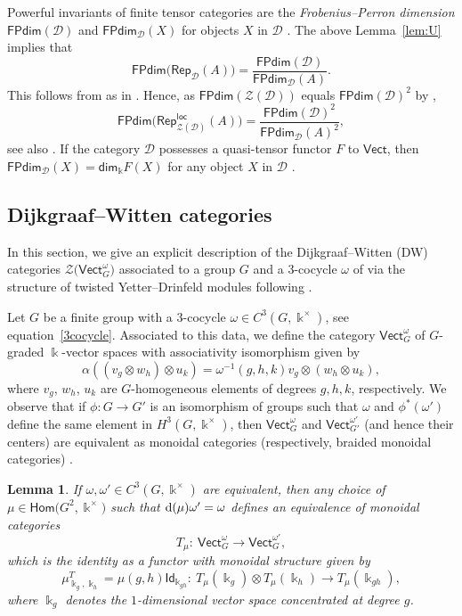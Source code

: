 \documentclass[10pt,a4paper]{amsart}
\numberwithin{equation}{section}
\newtheorem{Lemma}[Theorem]{Lemma}
\newcommand{\deri}{{\rm d}}
\newcommand{\Hom}{\mathsf{Hom}}
\newcommand{\ide}{\mathsf{Id}}
\newcommand{\FPdim}{\mathsf{FPdim}}
\renewcommand{\dim}{\mathsf{dim}}
\newcommand{\Rep}{\mathsf{Rep}}
\newcommand{\locmod}{\mathsf{Rep}^{\mathsf{loc}}}
\newcommand{\Vect}{\mathsf{Vect}}
\newcommand{\cD}{\mathcal{D}}
\newcommand{\cZ}{\mathcal{Z}}
\begin{document}
Powerful invariants of finite tensor categories are the \emph{Frobenius--Perron dimension} $\FPdim(\cD)$ and $\FPdim_\cD(X)$ for objects $X$ in $\cD$ \cite[Section~4.5]{EGNO}. The above Lemma~\ref{lem:U} implies that
\begin{equation}\label{eq:FPdim-Rep}
\FPdim \big(\Rep_{\cD}(A)\big)=\frac{\FPdim(\cD)}{\FPdim_\cD(A)}.
\end{equation}
This follows from \cite[Lemma~6.2.4]{EGNO} as in \cite[Lemma 4.5]{LW3}. Hence, as $\FPdim(\cZ(\cD))$ equals $\FPdim(\cD)^2$ by \cite[Theorem~7.16.6]{EGNO},
\[
\FPdim \big(\locmod_{\cZ(\cD)}(A)\big)=\frac{\FPdim(\cD)^2}{\FPdim_\cD(A)^2},
\]
see also \cite[Corollary~4.1]{DMNO}. If the category $\cD$ possesses a quasi-tensor functor $F$ to $\Vect$, then $\FPdim_{\cD}(X)=\dim_\Bbbk F(X)$ for any object $X$ in $\cD$ \cite[Proposition~4.5.7]{EGNO}.


\subsection{Dijkgraaf--Witten categories}
In this section, we give an explicit description of the Dijkgraaf--Witten (DW) categories $\cZ\big(\Vect_G^\omega\big)$ associated to a group $G$ and a $3$-cocycle $\omega$ of \cite{DPR} via the structure of twisted Yetter--Drinfeld modules following \cite[Proposition~3.2]{Maj98}.

Let $G$ be a finite group with a $3$-cocycle $\omega\in C^3(G,\Bbbk^\times)$, see equation~\eqref{3cocycle}.
Associated to this data, we define the category $\Vect_G^\omega$ of $G$-graded $\Bbbk$-vector spaces with associativity isomorphism given by \[\alpha((v_g\otimes w_h)\otimes u_k)=\omega^{-1}(g,h,k)v_g\otimes (w_h\otimes u_k),\]
where $v_g$, $w_h$, $u_k$ are $G$-homogeneous elements of degrees $g,h,k$, respectively. We observe that if $\phi\colon G\to G'$ is an isomorphism of groups such that $\omega$ and $\phi^{*}(\omega')$ define the same element in $H^3(G,\Bbbk^\times)$, then $\Vect_G^\omega$ and $\Vect_{G'}^{\omega'}$ (and hence their centers) are equivalent as monoidal categories (respectively, braided monoidal categories) \cite[Section~2.6]{EGNO}.

\begin{Lemma}\label{lem:omega-equiv}
If $\omega,\omega'\in C^3(G,\Bbbk^\times)$ are equivalent, then any choice of $\mu\in \Hom\big(G^2,\Bbbk^\times\big)$ such that $\deri(\mu)\omega'=\omega$ defines an equivalence of monoidal categories
\[T_\mu\colon\ \Vect^\omega_G\to \Vect_G^{\omega'},\]
which is the identity as a functor with monoidal structure given by
\[\mu^{T}_{\Bbbk_g,\Bbbk_h}=\mu(g,h)\ide_{\Bbbk_{gh}}\colon\ T_\mu(\Bbbk_g)\otimes T_\mu(\Bbbk_h)\to T_\mu(\Bbbk_{gh}),\]
where $\Bbbk_g$ denotes the $1$-dimensional vector space concentrated at degree $g$.
\end{Lemma}
\end{document}
